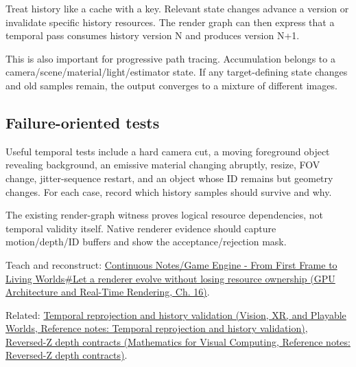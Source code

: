 Treat history like a cache with a key. Relevant state changes advance a version or invalidate specific history resources. The render graph can then express that a temporal pass consumes history version N and produces version N+1.

This is also important for progressive path tracing. Accumulation belongs to a camera/scene/material/light/estimator state. If any target-defining state changes and old samples remain, the output converges to a mixture of different images.

\subsection{Failure-oriented tests}\label{appendix-2e7e9fd28a2c-failure-oriented-tests}

Useful temporal tests include a hard camera cut, a moving foreground object revealing background, an emissive material changing abruptly, resize, FOV change, jitter-sequence restart, and an object whose ID remains but geometry changes. For each case, record which history samples should survive and why.

The existing render-graph witness proves logical resource dependencies, not temporal validity itself. Native renderer evidence should capture motion/depth/ID buffers and show the acceptance/rejection mask.

Teach and reconstruct: \href{../06-GPU-Architecture-and-Real-Time-Rendering/main.pdf\#nameddest=06-engine-ii-ch025-let-a-renderer-evolve-without-losing-resource-ownership}{Continuous Notes/Game Engine - From First Frame to Living Worlds\#Let a renderer evolve without losing resource ownership (GPU Architecture and Real-Time Rendering, Ch. 16)}.

Related: \href{../07-Vision-XR-and-Playable-Worlds/main.pdf\#nameddest=appendix-0727340a4428}{Temporal reprojection and history validation (Vision, XR, and Playable Worlds, Reference notes: Temporal reprojection and history validation)}, \href{../02-Mathematics-for-Visual-Computing/main.pdf\#nameddest=appendix-275ec8847057}{Reversed-Z depth contracts (Mathematics for Visual Computing, Reference notes: Reversed-Z depth contracts)}.
